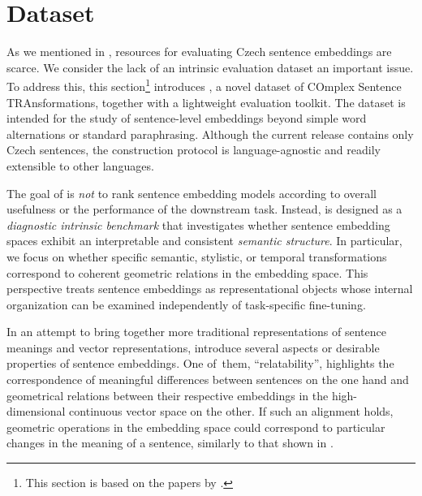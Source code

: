 \section{\costra Dataset}
\label{sec:costra}
As we mentioned in , resources for evaluating Czech sentence embeddings are scarce.  We consider the lack of an intrinsic evaluation dataset an important issue. To address this, this section\footnote{This section is based on the papers by \cite{costra10,costra11}.} introduces \costra, a novel dataset of COmplex Sentence TRAnsformations, together with a lightweight evaluation toolkit. The dataset is intended for the study of sentence-level embeddings beyond simple word alternations or standard paraphrasing. Although the current release contains only Czech sentences, the construction protocol is language-agnostic and readily extensible to other languages.

The goal of \costra is \emph{not} to rank sentence embedding models according to overall usefulness or the performance of the downstream task. Instead, \costra is designed as a \emph{diagnostic intrinsic benchmark} that investigates whether sentence embedding spaces exhibit an interpretable and consistent \emph{semantic structure}. In particular, we focus on whether specific semantic, stylistic, or temporal transformations correspond to coherent geometric relations in the embedding space. This perspective treats sentence embeddings as representational objects whose internal organization can be examined independently of task-specific fine-tuning.

In an attempt to bring together more traditional representations of sentence meanings and vector representations,  introduce several aspects or desirable properties of sentence embeddings. One of~them, ``relatability'', highlights the correspondence of meaningful differences between sentences on the one hand and geometrical relations between their respective embeddings in the high-dimensional continuous vector space on the other. If such an alignment holds, geometric operations in the embedding space could correspond to particular changes in the meaning of a sentence, similarly to that shown in .

